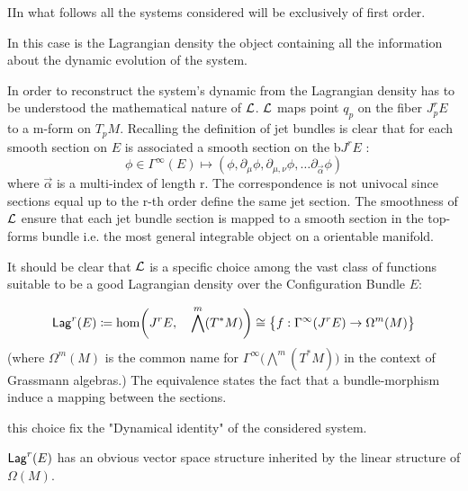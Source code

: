 \documentclass[Main]{subfiles}
\begin{document}
	\begin{NB}
		IIn what follows all the systems considered will be exclusively of first order.
	\end{NB}	
	
	
	In this case is the Lagrangian density the object containing all the information about the dynamic evolution of the system.

	In order to reconstruct the system's dynamic from the Lagrangian density has to be understood the mathematical nature of $\mathcal{L}$.
	$\mathcal{L}$ maps point $q_p$ on the fiber $J^r_p E$ to a m-form on $T_p M$.
	Recalling the definition of jet bundles is clear that for each smooth section on $E$ is associated a smooth section on the b$J^rE$ :
	\begin{displaymath}
		\phi \in \Gamma^\infty (E) \mapsto (\phi, \partial_\mu \phi, \partial_{\mu, \nu} \phi , \ldots \partial_{\vec{\alpha}}\phi)
	\end{displaymath}
	where  $\vec{\alpha}$ is a multi-index of length r.
	The correspondence is not univocal since sections equal up to the r-th order define the same jet section.
	The smoothness of $\mathcal{L}$ ensure that each jet bundle section is mapped to a smooth section in the top-forms bundle i.e. the most general integrable object on a orientable manifold.
	
	It should be clear that $\mathcal{L}$ is a specific choice among the vast class of functions suitable to be a good Lagrangian density over the  Configuration Bundle $E$:
	\begin{definition}
		\begin{displaymath}
			\mathsf{Lag}^r (E) \coloneqq \hom\biggr(J^r E,\quad \bigwedge^m( T^*M)\biggr)  \cong \big\{f:\Gamma^\infty(J^r E) \rightarrow \Omega^m(M)  \big\}
		\end{displaymath}
	(where $\Omega^m(M)$ is the common name for $\Gamma^\infty \big( \bigwedge^m( T^*M) \big)$ in the context of Grassmann algebras.)
	The equivalence states the fact that a bundle-morphism induce a mapping between the sections.
	\end{definition}
	 this choice fix the "Dynamical identity" of the considered system.
	\begin{proposition}
		$\mathsf{Lag}^r(E)$ has an obvious vector space structure inherited by the linear structure of $\Omega(M)$.
	\end{proposition}
	
\end{document}
